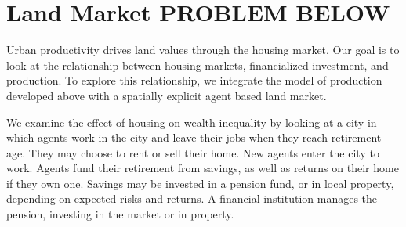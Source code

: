 \section{Land Market PROBLEM BELOW}

Urban productivity %
drives land values through the housing market.%
Our goal is to look at the relationship between housing markets, financialized investment, and production. %
To explore this relationship, we integrate the model of production developed above with a spatially explicit agent based land market. %

We examine the effect of housing on wealth inequality by looking at 
a city in which agents work in the city and leave their jobs when they reach retirement age. They may choose to rent or sell their home. %
New agents enter the city to work. 
Agents fund their retirement from savings, as well as returns on their home if they own one. Savings may be invested in a pension fund, or in local property,  depending on expected risks and returns. %
A financial institution manages the pension, investing in the market or in property.

 
